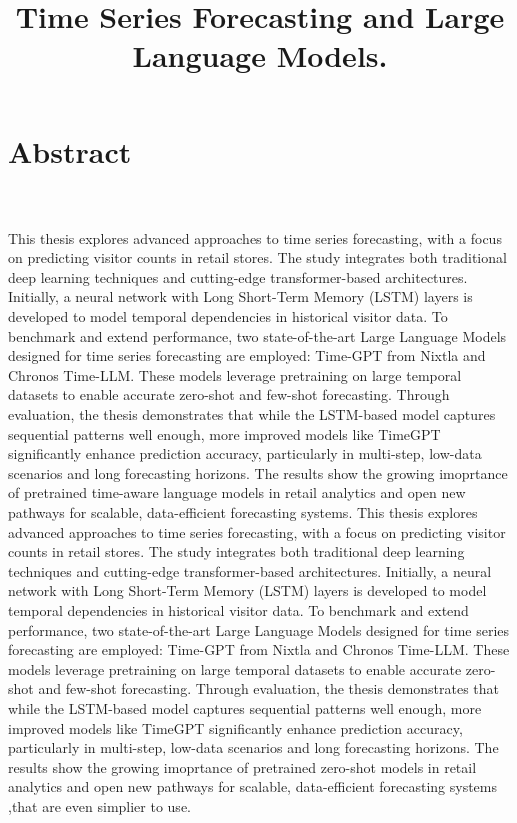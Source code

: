 \documentclass{article}
\begin{document}
\section{Abstract}
\title{\textbf{Time Series Forecasting and Large Language Models.}} \\
\\
This thesis explores advanced approaches to time series forecasting, with a focus on predicting visitor counts in retail stores. The study integrates both traditional deep learning techniques and cutting-edge transformer-based architectures. Initially, a neural network with Long Short-Term Memory (LSTM) layers is developed to model temporal dependencies in historical visitor data. To benchmark and extend performance, two state-of-the-art Large Language Models designed for time series forecasting are employed: Time-GPT from Nixtla and Chronos Time-LLM. These models leverage pretraining on large temporal datasets to enable accurate zero-shot and few-shot forecasting. Through evaluation, the thesis demonstrates that while the LSTM-based model captures sequential patterns well enough, more improved models like TimeGPT  significantly enhance prediction accuracy, particularly in multi-step, low-data scenarios and long forecasting horizons. The results show the growing imoprtance of pretrained time-aware language models in retail analytics and open new pathways for scalable, data-efficient forecasting systems.
This thesis explores advanced approaches to time series forecasting, with a focus on predicting visitor counts in retail stores. The study integrates both traditional deep learning techniques and cutting-edge transformer-based architectures. Initially, a neural network with Long Short-Term Memory (LSTM) layers is developed to model temporal dependencies in historical visitor data. To benchmark and extend performance, two state-of-the-art Large Language Models designed for time series forecasting are employed: Time-GPT from Nixtla and Chronos Time-LLM. These models leverage pretraining on large temporal datasets to enable accurate zero-shot and few-shot forecasting. Through evaluation, the thesis demonstrates that while the LSTM-based model captures sequential patterns well enough, more improved models like TimeGPT  significantly enhance prediction accuracy, particularly in multi-step, low-data scenarios and long forecasting horizons. The results show the growing imoprtance of pretrained zero-shot models in retail analytics and open new pathways for scalable, data-efficient forecasting systems ,that are even simplier to use.
\end{document}
